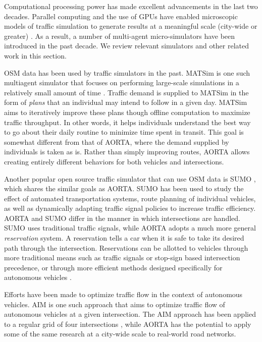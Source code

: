 \documentclass[letterpaper, 10 pt, conference]{ieeeconf}  %
\begin{document}

Computational processing power has made excellent advancements in the last two
decades. Parallel computing and the use of GPUs have enabled microscopic models
of traffic simulation to generate results at a meaningful scale (city-wide or
greater) \cite{nagel1994microscopic,shen2011agent}. As a result, a number of
multi-agent micro-simulators have been introduced in the past decade. We review
relevant simulators and other related work in this section.

OSM data has been used by traffic simulators in the past. MATSim is one such
multiagent simulator that focuses on performing large-scale simulations in a
relatively small amount of time \cite{balmer2009matsim}. Traffic demand is
supplied to MATSim in the form of \textit{plans} that an individual may intend
to follow in a given day. MATSim aims to iteratively improve these plans though
offline computation to maximize traffic throughput. In other words, it helps
individuals understand the best way to go about their daily routine to minimize
time spent in transit. This goal is somewhat different from that of AORTA,
where the demand supplied by individuals is taken as is. Rather than simply
improving routes, AORTA allows creating entirely different behaviors for both
vehicles and intersections.

Another popular open source traffic simulator that can use OSM data is SUMO
\cite{SUMO2011}, which shares the similar goals as AORTA. SUMO has been used to
study the effect of automated transportation systems, route planning of
individual vehicles, as well as dynamically adapting traffic signal policies to
increase traffic efficiency.  AORTA and SUMO differ in the manner in which
intersections are handled. SUMO uses traditional traffic signals, while AORTA
adopts a much more general \textit{reservation} system. A reservation tells a
car when it is safe to take its desired path through the intersection.
Reservations can be allotted to vehicles through more traditional means such as
traffic signals or stop-sign based intersection precedence, or through more
efficient methods designed specifically for autonomous vehicles
\cite{JAIR08-dresner}.

Efforts have been made to optimize traffic flow in the context of autonomous
vehicles. AIM \cite{JAIR08-dresner} is one such approach that aims to optimize
traffic flow of autonomous vehicles at a given intersection. The AIM approach
has been applied to a regular grid of four intersections
\cite{IROS11-hausknecht}, while AORTA has the potential to apply some of the
same research at a city-wide scale to real-world road networks.
\end{document}
